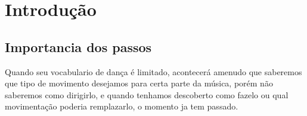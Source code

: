 \chapter{Introdução}

\section{Importancia dos passos}
Quando seu vocabulario de dança é limitado,
acontecerá amenudo que saberemos que tipo de movimento desejamos para certa parte da música,
porém não saberemos como dirigirlo,
e quando tenhamos descoberto como fazelo ou qual movimentação poderia remplazarlo,
o momento ja tem passado.

